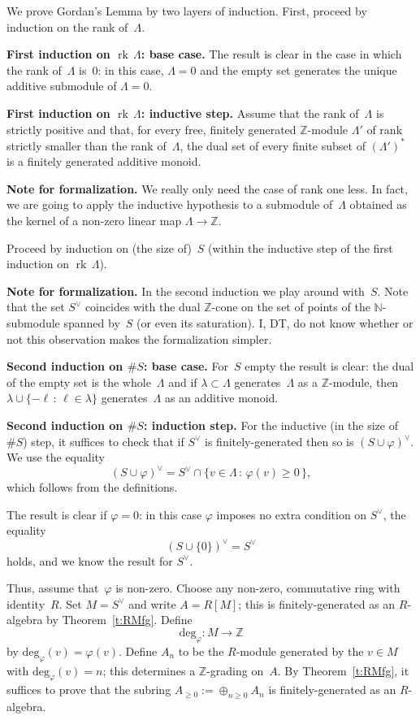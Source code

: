 \documentclass{amsart}
\newcommand{\N}{\mathbb{N}}
\newcommand{\Z}{\mathbb{Z}}
\newcommand{\ev}{\textrm{deg}_\varphi}
\newcommand{\form}[1]{\medskip
\parbox{330pt}
{\small{{\textbf{Note for formalization.}}
#1}}
\medskip}
\DeclareMathOperator{\rk}{rk\,}
\begin{document}
We prove Gordan's Lemma by two layers of induction.  First, proceed by induction on the rank of~$\Lambda$.

\noindent
{\textbf{First induction on $\rk \Lambda$: base case.}}
The result is clear in the case in which the rank of~$\Lambda$ is~$0$: in this case, $\Lambda = 0$ and the empty set generates the unique additive submodule of $\Lambda = 0$.

\noindent
{\textbf{First induction on $\rk \Lambda$: inductive step.}}
Assume that the rank of~$\Lambda$ is strictly positive and that, for every free, finitely generated $\Z$-module $\Lambda'$ of rank strictly smaller than the rank of~$\Lambda$, the dual set of every finite subset of $\left(\Lambda'\right)^*$ is a finitely generated additive monoid.

\form{We really only need the case of rank one less.  In fact, we are going to apply the inductive hypothesis to a submodule of~$\Lambda$ obtained as the kernel of a non-zero linear map $\Lambda \to \Z$.}

Proceed by induction on (the size of)~$S$ (within the inductive step of the first induction on $\rk \Lambda$).

\form{In the second induction we play around with~$S$.  Note that the set $S^\vee$ coincides with the dual $\Z$-cone on the set of points of the $\N$-submodule spanned by~$S$ (or even its saturation).  I, DT, do not know whether or not this observation makes the formalization simpler.}

\noindent
{\textbf{Second induction on $\# S$: base case.}}
For~$S$ empty the result is clear: the dual of the empty set is the whole~$\Lambda$ and if $\lambda \subset \Lambda$ generates~$\Lambda$ as a $\Z$-module, then $\lambda \cup \{ -\ell \, : \, \ell \in \lambda \}$ generates~$\Lambda$ as an additive monoid.

\noindent
{\textbf{Second induction on $\# S$: induction step.}}
For the inductive (in the size of $\#S$) step, it suffices to check that if $S^\vee$ is finitely-generated then so is $(S\cup{\varphi})^\vee$.  We use the equality
\[
(S\cup{\varphi})^\vee = S^\vee \cap \{v \in \Lambda \,:\, \varphi(v)\geq0\,\},
\]
which follows from the definitions.

The result is clear if $\varphi = 0$: in this case $\varphi$ imposes no extra condition on $S^\vee$, the equality
\[
(S \cup \{0\})^\vee = S^\vee
\]
holds, and we know the result for $S^\vee$.

Thus, assume that~$\varphi$ is non-zero.  Choose any non-zero, commutative ring with identity~$R$.  Set $M=S^\vee$ and write $A=R[M]$; this is finitely-generated as an $R$-algebra by Theorem~\ref{t:RMfg}. Define
\[
\ev \colon M\to\Z
\]
by $\ev (v)=\varphi(v)$. Define $A_n$ to be the $R$-module generated by the $v \in M$ with $\ev(v)=n$; this determines a $\Z$-grading on~$A$. By Theorem~\ref{t:RMfg}, it suffices to prove that the subring $A_{\geq0}:=\oplus_{n\geq0}A_n$ is finitely-generated as an $R$-algebra.
\end{document}
